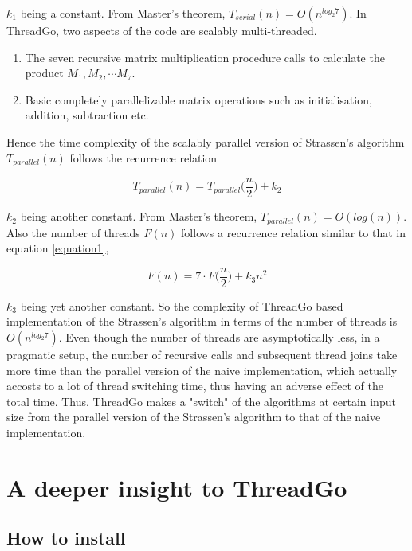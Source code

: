 \documentclass{article}
\begin{document}
$k_1$ being a constant. From Master's theorem, $T_{serial}(n) = O(n^{log_2 7})$. In ThreadGo, two aspects of the code are scalably multi-threaded.

\begin{enumerate}
	\item The seven recursive matrix multiplication procedure calls to calculate the product $M_1, M_2, \cdots M_7$.
	\item Basic completely parallelizable matrix operations such as initialisation, addition, subtraction etc.
\end{enumerate}

Hence the time complexity of the scalably parallel version of Strassen's algorithm $T_{parallel}(n)$ follows the recurrence relation

\begin{equation}
T_{parallel}(n) = T_{parallel}\bigg(\frac{n}{2}\bigg) + k_2
\end{equation}

$k_2$ being another constant. From Master's theorem, $T_{parallel}(n) = O(log(n))$. Also the number of threads $F(n)$ follows a recurrence relation similar to that in equation \ref{equation1},

\begin{equation}
F(n) = 7 \cdot F\bigg(\frac{n}{2}\bigg) + k_3 n^2
\end{equation}

$k_3$ being yet another constant. So the complexity of ThreadGo based implementation of the Strassen's algorithm in terms of the number of threads is $O(n^{log_2 7})$. Even though the number of threads are asymptotically less, in a pragmatic setup, the number of recursive calls and subsequent thread joins take more time than the parallel version of the naive implementation, which actually accosts to a lot of thread switching time, thus having an adverse effect of the total time. Thus, ThreadGo makes a "switch" of the algorithms at certain input size from the parallel version of the Strassen's algorithm to that of the naive implementation.

\section{A deeper insight to ThreadGo}

\subsection{How to install}
\end{document}
